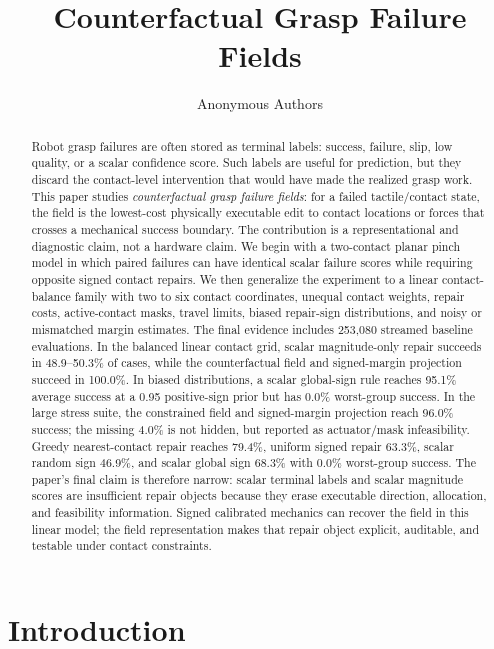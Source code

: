 \documentclass{article}
\title{Counterfactual Grasp Failure Fields}
\author{Anonymous Authors}
\begin{document}
\maketitle

\begin{abstract}
Robot grasp failures are often stored as terminal labels: success, failure, slip, low quality, or a scalar confidence score. Such labels are useful for prediction, but they discard the contact-level intervention that would have made the realized grasp work. This paper studies \emph{counterfactual grasp failure fields}: for a failed tactile/contact state, the field is the lowest-cost physically executable edit to contact locations or forces that crosses a mechanical success boundary. The contribution is a representational and diagnostic claim, not a hardware claim. We begin with a two-contact planar pinch model in which paired failures can have identical scalar failure scores while requiring opposite signed contact repairs. We then generalize the experiment to a linear contact-balance family with two to six contact coordinates, unequal contact weights, repair costs, active-contact masks, travel limits, biased repair-sign distributions, and noisy or mismatched margin estimates. The final evidence includes 253,080 streamed baseline evaluations. In the balanced linear contact grid, scalar magnitude-only repair succeeds in 48.9--50.3\% of cases, while the counterfactual field and signed-margin projection succeed in 100.0\%. In biased distributions, a scalar global-sign rule reaches 95.1\% average success at a 0.95 positive-sign prior but has 0.0\% worst-group success. In the large stress suite, the constrained field and signed-margin projection reach 96.0\% success; the missing 4.0\% is not hidden, but reported as actuator/mask infeasibility. Greedy nearest-contact repair reaches 79.4\%, uniform signed repair 63.3\%, scalar random sign 46.9\%, and scalar global sign 68.3\% with 0.0\% worst-group success. The paper's final claim is therefore narrow: scalar terminal labels and scalar magnitude scores are insufficient repair objects because they erase executable direction, allocation, and feasibility information. Signed calibrated mechanics can recover the field in this linear model; the field representation makes that repair object explicit, auditable, and testable under contact constraints.
\end{abstract}

\section{Introduction}
\end{document}
